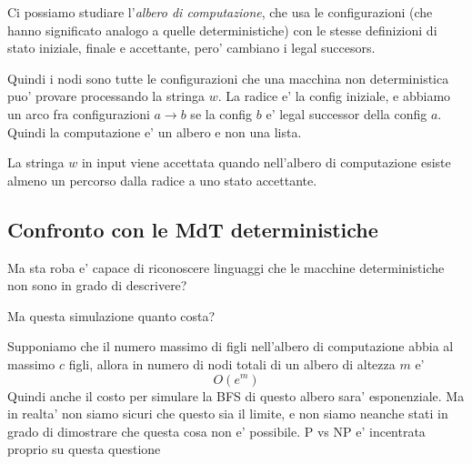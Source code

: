 Ci possiamo studiare l'\textit{albero di computazione}, che usa le configurazioni (che hanno significato analogo a quelle deterministiche) con le stesse definizioni di stato iniziale, finale e accettante, pero' cambiano i legal succesors.

Quindi i nodi sono tutte le configurazioni che una macchina non deterministica puo' provare processando la stringa $ w $.
La radice e' la config iniziale, e abbiamo un arco fra configurazioni $ a \to b $ se la config $ b $ e' legal successor della config $ a $.
Quindi la computazione e' un albero e non una lista.

La stringa $ w $ in input viene accettata quando nell'albero di computazione esiste almeno un percorso dalla radice a uno stato accettante.

\subsection{Confronto con le MdT deterministiche}
Ma sta roba e' capace di riconoscere linguaggi che le macchine deterministiche non sono in grado di descrivere? 


Ma questa simulazione quanto costa? 

Supponiamo che il numero massimo di figli nell'albero di computazione abbia al massimo $ c $ figli, allora in numero di nodi totali di un albero di altezza $ m $ e'
\[
  O(e^m)
\]
Quindi anche il costo per simulare la BFS di questo albero sara' esponenziale. Ma in realta' non siamo sicuri che questo sia il limite, e non siamo neanche stati in grado di dimostrare che questa cosa non e' possibile. P vs NP e' incentrata proprio su questa questione 



